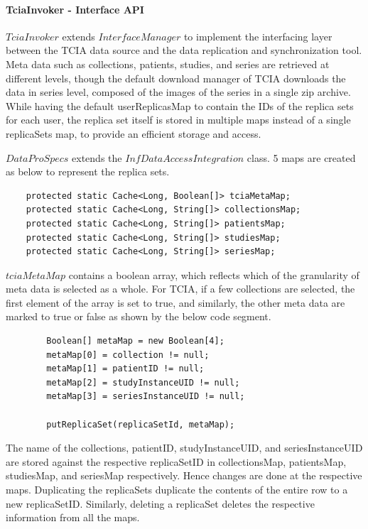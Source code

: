 \documentclass[conference]{IEEEtran}
\begin{document}
\paragraph*{TciaInvoker - Interface API}
$TciaInvoker$ extends $InterfaceManager$ to implement the interfacing layer between the TCIA data source and the data replication and synchronization tool. Meta data such as collections, patients, studies, and series are retrieved at different levels, though the default download manager of TCIA downloads the data in series level, composed of the images of the series in a single zip archive. While having the default userReplicasMap to contain the IDs of the replica sets for each user, the replica set itself is stored in multiple maps instead of a single replicaSets map, to provide an efficient storage and access.

$DataProSpecs$ extends the $InfDataAccessIntegration$ class. 5 maps are created as below to represent the replica sets.
\begin{lstlisting}  
    protected static Cache<Long, Boolean[]> tciaMetaMap;
    protected static Cache<Long, String[]> collectionsMap;
    protected static Cache<Long, String[]> patientsMap;
    protected static Cache<Long, String[]> studiesMap;
    protected static Cache<Long, String[]> seriesMap;
\end{lstlisting} 

$tciaMetaMap$ contains a boolean array, which reflects which of the granularity of meta data is selected as a whole. For TCIA, if a few collections are selected, the first element of the array is set to true, and similarly, the other meta data are marked to true or false as shown by the below code segment.
\begin{lstlisting}  
        Boolean[] metaMap = new Boolean[4];
        metaMap[0] = collection != null;
        metaMap[1] = patientID != null;
        metaMap[2] = studyInstanceUID != null;
        metaMap[3] = seriesInstanceUID != null;

        putReplicaSet(replicaSetId, metaMap);
\end{lstlisting} 
The name of the collections, patientID, studyInstanceUID, and seriesInstanceUID are stored against the respective replicaSetID in collectionsMap, patientsMap, studiesMap, and seriesMap respectively. Hence changes are done at the respective maps. Duplicating the replicaSets duplicate the contents of the entire row to a new replicaSetID. Similarly, deleting a replicaSet deletes the respective information from all the maps.
\end{document}
